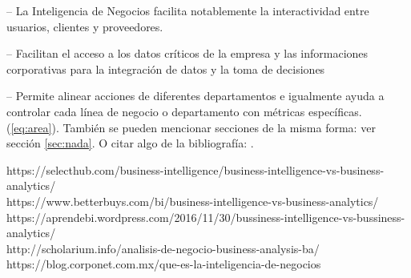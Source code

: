  – La Inteligencia de Negocios facilita notablemente la interactividad entre usuarios, clientes y proveedores.

 – Facilitan el acceso a los datos críticos de la empresa y las informaciones corporativas para la integración de datos y la toma de decisiones

 – Permite alinear acciones de diferentes departamentos e igualmente ayuda a controlar cada línea de negocio o departamento con métricas específicas.
 \\

(\ref{eq:area}).
También se pueden mencionar secciones de la misma forma: ver sección
\ref{sec:nada}. O citar algo de la bibliografía: \cite{Cd94}.


\begin{thebibliography}{99}

 https://selecthub.com/business-intelligence/business-intelligence-vs-business-analytics/
\\
 https://www.betterbuys.com/bi/business-intelligence-vs-business-analytics/
\\
 https://aprendebi.wordpress.com/2016/11/30/bussiness-intelligence-vs-bussiness-analytics/
\\
 http://scholarium.info/analisis-de-negocio-business-analysis-ba/
\\
 https://blog.corponet.com.mx/que-es-la-inteligencia-de-negocios

\end{thebibliography}



